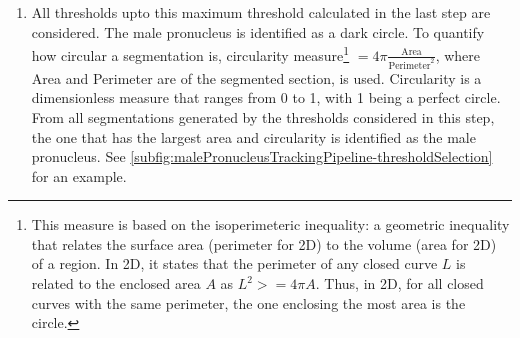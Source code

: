 \begin{enumerate}
    \item All thresholds upto this maximum threshold calculated in the last step are considered. The male pronucleus is identified as a dark circle. To quantify how circular a segmentation is, circularity measure\footnote{This measure is based on the isoperimeteric inequality: a geometric inequality that relates the surface area (perimeter for 2D) to the volume (area for 2D) of a region. In 2D, it states that the perimeter of any closed curve $L$ is related to the enclosed area $A$ as $L^2 >= 4\pi A$. Thus, in 2D, for all closed curves with the same perimeter, the one enclosing the most area is the circle.} $ = 4\pi\frac{\textrm{Area}}{\textrm{Perimeter}^2}$, where Area and Perimeter are of the segmented section, is used. Circularity is a dimensionless measure that ranges from \num{0} to \num{1}, with \num{1} being a perfect circle. From all segmentations generated by the thresholds considered in this step, the one that has the largest area and circularity is identified as the male pronucleus. See \autoref{subfig:malePronucleusTrackingPipeline-thresholdSelection} for an example.
\end{enumerate}

